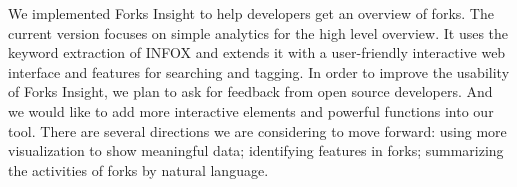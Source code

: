 We implemented Forks Insight to help developers get an overview of forks. The current version focuses on simple analytics for the high level overview. It uses the keyword extraction of INFOX and extends it with a user-friendly interactive web interface and features for searching and tagging. In order to improve the usability of Forks Insight, we plan to ask for feedback from open source developers. And we would like to add more interactive elements and powerful functions into our tool. There are several directions we are considering to move forward: using more visualization to show meaningful data; identifying features in forks; summarizing the activities of forks by natural language.

\iffalse
\begin{acks}
  TODO
\end{acks}
\fi
